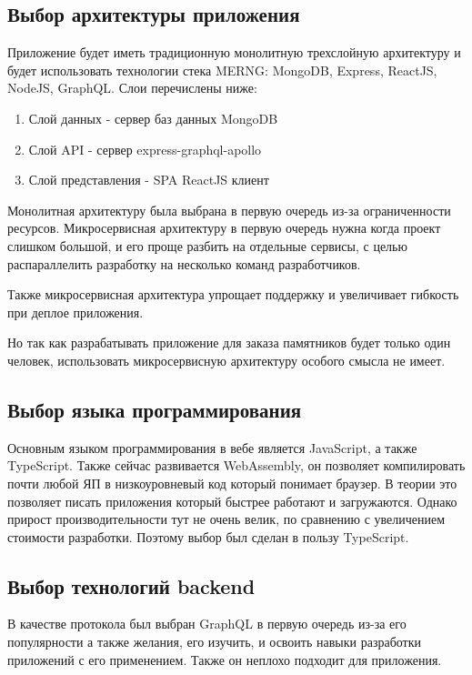 \documentclass[a4paper,article,14pt]{extarticle}
\begin{document}
\subsection{Выбор архитектуры приложения}

Приложение будет иметь традиционную монолитную трехслойную архитектуру и будет использовать технологии стека MERNG: MongoDB, Express,
ReactJS, NodeJS, GraphQL. Слои перечислены ниже:

\begin{enumerate}
    \item Слой данных - сервер баз данных MongoDB
    \item Слой API - сервер express-graphql-apollo
    \item Слой представления - SPA ReactJS клиент
\end{enumerate}

Монолитная архитектуру была выбрана в первую очередь из-за ограниченности ресурсов. 
Микросервисная архитектуру в первую очередь нужна когда проект слишком большой,
и его проще разбить на отдельные сервисы, с целью распараллелить разработку на несколько команд разработчиков.

Также микросервисная архитектура упрощает поддержку и увеличивает гибкость при деплое приложения.

Но так как разрабатывать приложение для заказа памятников будет только один человек, использовать микросервисную архитектуру особого смысла не имеет.

\subsection{Выбор языка программирования}

Основным языком программирования в вебе является JavaScript, а также TypeScript. 
Также сейчас развивается WebAssembly, он позволяет компилировать почти любой ЯП в низкоуровневый код который понимает браузер.
В теории это позволяет писать приложения который быстрее работают и загружаются. Однако прирост производительности тут не очень велик, 
по сравнению с увеличением стоимости разработки. Поэтому выбор был сделан в пользу TypeScript.

\subsection{Выбор технологий backend}

В качестве протокола был выбран GraphQL в первую очередь из-за его популярности а также желания,
его изучить, и освоить навыки разработки приложений с его применением. Также он неплохо подходит для приложения.
\end{document}

